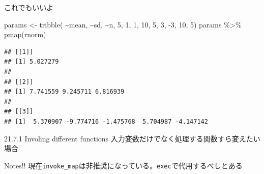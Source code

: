 \documentclass[
  ignorenonframetext,
  aspectratio=169]{beamer}
\newenvironment{Shaded}{\begin{snugshade}}{\end{snugshade}}
\newcommand{\DecValTok}[1]{\textcolor[rgb]{0.00,0.00,0.81}{#1}}
\newcommand{\FunctionTok}[1]{\textcolor[rgb]{0.00,0.00,0.00}{#1}}
\newcommand{\NormalTok}[1]{#1}
\newcommand{\OtherTok}[1]{\textcolor[rgb]{0.56,0.35,0.01}{#1}}
\newcommand{\SpecialCharTok}[1]{\textcolor[rgb]{0.00,0.00,0.00}{#1}}
\begin{document}
\begin{frame}[fragile]{これでもいいよ}
\protect\hypertarget{ux3053ux308cux3067ux3082ux3044ux3044ux3088}{}
\begin{Shaded}
\begin{Highlighting}[]
\NormalTok{params }\OtherTok{\textless{}{-}} \FunctionTok{tribble}\NormalTok{(}
          \SpecialCharTok{\textasciitilde{}}\NormalTok{mean, }\SpecialCharTok{\textasciitilde{}}\NormalTok{sd, }\SpecialCharTok{\textasciitilde{}}\NormalTok{n,}
          \DecValTok{5}\NormalTok{,     }\DecValTok{1}\NormalTok{,   }\DecValTok{1}\NormalTok{,}
          \DecValTok{10}\NormalTok{,    }\DecValTok{5}\NormalTok{,   }\DecValTok{3}\NormalTok{,}
          \SpecialCharTok{{-}}\DecValTok{3}\NormalTok{,    }\DecValTok{10}\NormalTok{,  }\DecValTok{5}\NormalTok{)}
\NormalTok{params }\SpecialCharTok{\%\textgreater{}\%} \FunctionTok{pmap}\NormalTok{(rnorm)}
\end{Highlighting}
\end{Shaded}

\begin{verbatim}
## [[1]]
## [1] 5.027279
## 
## [[2]]
## [1] 7.741559 9.245711 6.816939
## 
## [[3]]
## [1]  5.370907 -9.774716 -1.475768  5.704987 -4.147142
\end{verbatim}
\end{frame}

\begin{frame}[fragile]{21.7.1 Involing different functions}
\protect\hypertarget{involing-different-functions}{}
入力変数だけでなく処理する関数すら変えたい場合

\begin{block}{Notes!!}
\protect\hypertarget{notes}{}
現在\texttt{invoke\_map}は非推奨になっている。\texttt{exec}で代用するべしとある
\end{block}
\end{frame}
\end{document}
